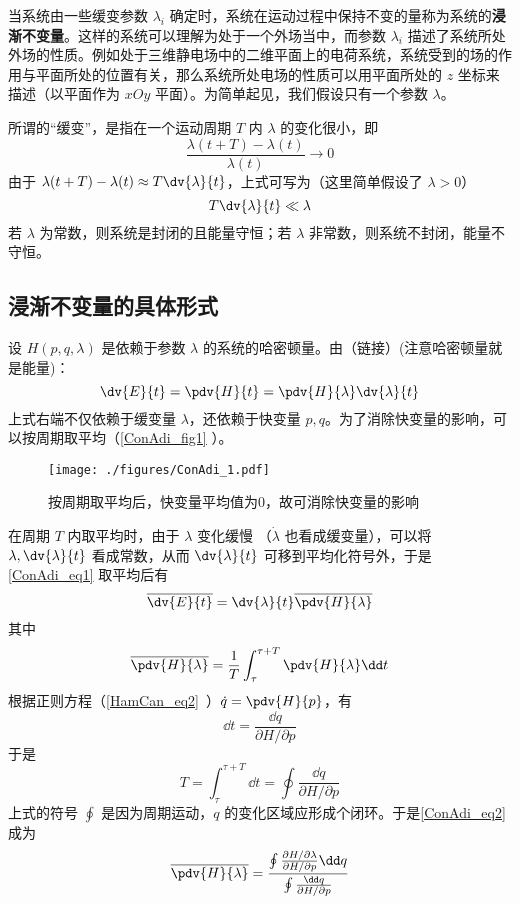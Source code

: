 
当系统由一些缓变参数 $\lambda_i$ 确定时，系统在运动过程中保持不变的量称为系统的\textbf{浸渐不变量}。这样的系统可以理解为处于一个外场当中，而参数 $\lambda_i$ 描述了系统所处外场的性质。例如处于三维静电场中的二维平面上的电荷系统，系统受到的场的作用与平面所处的位置有关，那么系统所处电场的性质可以用平面所处的 $z$ 坐标来描述（以平面作为 $xOy$ 平面）。为简单起见，我们假设只有一个参数 $\lambda$。

所谓的“缓变”，是指在一个运动周期 $T$ 内 $\lambda$ 的变化很小，即 
\begin{equation}\label{ConAdi_eq4}
\frac{\lambda(t+T)-\lambda(t)}{\lambda(t)}\rightarrow0
\end{equation}
由于 $\lambda(t+T)-\lambda(t)\approx T\dv{\lambda}{t}$，上式可写为（这里简单假设了 $\lambda>0$）
\begin{equation}
T\dv{\lambda}{t}\ll\lambda
\end{equation}
若 $\lambda$ 为常数，则系统是封闭的且能量守恒；若 $\lambda$ 非常数，则系统不封闭，能量不守恒。
\subsection{浸渐不变量的具体形式}
设 $H(p,q,\lambda)$ 是依赖于参数 $\lambda$ 的系统的哈密顿量。由（链接）(注意哈密顿量就是能量)：
\begin{equation}\label{ConAdi_eq1}
\dv{E}{t}=\pdv{H}{t}=\pdv{H}{\lambda}\dv{\lambda}{t}
\end{equation}
上式右端不仅依赖于缓变量 $\lambda$，还依赖于快变量 $p,q$。为了消除快变量的影响，可以按周期取平均（\autoref{ConAdi_fig1} ）。
\begin{figure}[ht]
\centering
\texttt{[image: ./figures/ConAdi\_1.pdf]}
\caption{按周期取平均后，快变量平均值为0，故可消除快变量的影响} \label{ConAdi_fig1}
\end{figure}
在周期 $T$ 内取平均时，由于 $\lambda$ 变化缓慢 （$\dot\lambda$ 也看成缓变量），可以将 $\lambda,\dv{\lambda}{t}$ 看成常数，从而 $\dv{\lambda}{t}$ 可移到平均化符号外，于是\autoref{ConAdi_eq1} 取平均后有
\begin{equation}\label{ConAdi_eq3}
\overline{\dv{E}{t}}=\dv{\lambda}{t}\overline{\pdv{H}{\lambda}}
\end{equation}
其中
\begin{equation}\label{ConAdi_eq2}
\overline{\pdv{H}{\lambda}}=\frac{1}{T}\int_\tau^{\tau+T}\pdv{H}{\lambda}\dd t
\end{equation}
根据正则方程（\autoref{HamCan_eq2}~）$\dot q=\pdv{H}{p}$，有
\begin{equation}
\dd t=\frac{\dd q}{\partial{H}/\partial{p}}
\end{equation}
于是
\begin{equation}
T=\int_{\tau}^{\tau+T}\dd t=\oint\frac{\dd q}{\partial{H}/\partial{p}}
\end{equation}
上式的符号 $\oint$ 是因为周期运动，$q$ 的变化区域应形成个闭环。于是\autoref{ConAdi_eq2} 成为
\begin{equation}
\overline{\pdv{H}{\lambda}}=\frac{\oint\frac{\partial{H}/\partial{\lambda}}{\partial{H}/\partial{p}}\dd q}
{\oint\frac{\dd q}{\partial{H}/\partial{p}}}
\end{equation}
 
